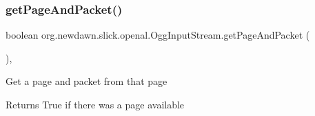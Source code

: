 \subsubsection{\texorpdfstring{get\+Page\+And\+Packet()}{getPageAndPacket()}}
{\footnotesize\ttfamily boolean org.\+newdawn.\+slick.\+openal.\+Ogg\+Input\+Stream.\+get\+Page\+And\+Packet (\begin{DoxyParamCaption}{ }\end{DoxyParamCaption})\hspace{0.3cm}{\ttfamily [inline]}, {\ttfamily [private]}}

Get a page and packet from that page

\begin{DoxyReturn}{Returns}
True if there was a page available 
\end{DoxyReturn}

